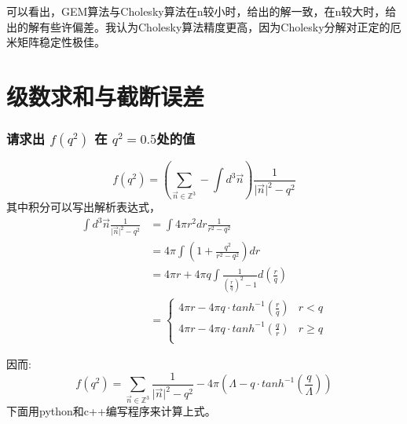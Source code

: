 \documentclass[11pt]{article}
\begin{document}
    可以看出，GEM算法与Cholesky算法在n较小时，给出的解一致，在n较大时，给出的解有些许偏差。我认为Cholesky算法精度更高，因为Cholesky分解对正定的厄米矩阵稳定性极佳。

\section{级数求和与截断误差}

\subsubsection{请求出 \(f (q^2)\) 在 \(q^2 = 0.5\)处的值}

\begin{equation}
f(q^2)=(\sum\limits_{\vec{n}\in\mathbb{Z}^3}-\int d^3 \vec{n})\frac{1}{\vert\vec{n}\vert^2-q^2}
\end{equation}
其中积分可以写出解析表达式， 
\begin{equation}
\begin{aligned}
\int d^3 \vec{n}\frac{1}{\vert\vec{n}\vert^2-q^2} &= \int 4\pi r^2dr\frac{1}{r^2-q^2}\\
&=4\pi\int(1+\frac{q^2}{r^2-q^2})dr\\
&=4\pi r+4\pi q \int\frac{1}{(\frac{r}{q})^2-1}d(\frac{r}{q})\\
&=\begin{cases}
    4\pi r- 4\pi q\cdot tanh^{-1}(\frac{r}{q}) & r< q\\
    4\pi r- 4\pi q\cdot tanh^{-1}(\frac{q}{r}) & r\geq q\\
\end{cases}
\end{aligned}
\end{equation}


    因而: \[
f(q^2)=\sum\limits_{\vec{n}\in\mathbb{Z}^3}\frac{1}{\vert\vec{n}\vert^2-q^2}-4\pi(\Lambda-q\cdot tanh^{-1}(\frac{q}{\Lambda}))
\] 
下面用python和c++编写程序来计算上式。
\end{document}
